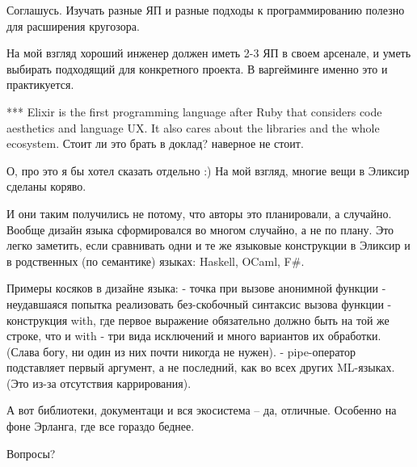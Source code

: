 \documentclass[10pt]{beamer}
\begin{document}
Соглашусь. Изучать разные ЯП и разные подходы к программированию полезно для расширения кругозора.

На мой взгляд хороший инженер должен иметь 2-3 ЯП в своем арсенале, и уметь выбирать подходящий для конкретного проекта.
В варгейминге именно это и практикуется.


*** Elixir is the first programming language after Ruby that considers code aesthetics and language UX. It also cares about the libraries and the whole ecosystem.
Стоит ли это брать в доклад? наверное не стоит.

О, про это я бы хотел сказать отдельно :) На мой взгляд, многие вещи в Эликсир сделаны коряво.

И они таким получились не потому, что авторы это планировали, а случайно.
Вообще дизайн языка сформировался во многом случайно, а не по плану.
Это легко заметить, если сравнивать одни и те же языковые конструкции в Эликсир и в родственных (по семантике) языках: Haskell, OCaml, F#.

Примеры косяков в дизайне языка:
- точка при вызове анонимной функции
- неудавшаяся попытка реализовать без-скобочный синтаксис вызова функции
- конструкция with, где первое выражение обязательно должно быть на той же строке, что и with
- три вида исключений и много вариантов их обработки. (Слава богу, ни один из них почти никогда не нужен).
- pipe-оператор подставляет первый аргумент, а не последний, как во всех других ML-языках. (Это из-за отсутствия каррирования).

А вот библиотеки, документаци и вся экосистема -- да, отличные. Особенно на фоне Эрланга, где все гораздо беднее.

\fi

\begin{frame}
\centering
Вопросы?
\end{frame}
\end{document}
